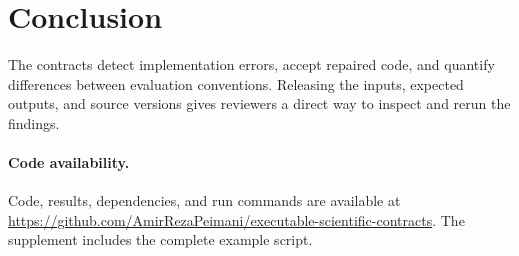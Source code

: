 \documentclass{article}
\begin{document}
\section{Conclusion}
The contracts detect implementation errors, accept repaired code, and quantify differences between evaluation conventions. Releasing the inputs, expected outputs, and source versions gives reviewers a direct way to inspect and rerun the findings.
\paragraph{Code availability.}
Code, results, dependencies, and run commands are available at \url{https://github.com/AmirRezaPeimani/executable-scientific-contracts}. The supplement includes the complete example script.
\label{end-of-main-text}
\clearpage
\end{document}
